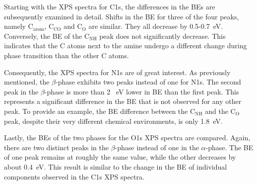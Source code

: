 Starting with the \ac{XPS} spectra for C1s, the differences in the \acp{BE} are subsequently examined in detail. Shifts in the \ac{BE} for three of the four peaks, namely $\mathrm{C_{arom}}$, $\mathrm{C_{CO}}$ and $\mathrm{C_{O}}$ are similar. They all decrease by 0.5-0.7~\si{\eV}. Conversely, the \ac{BE} of the $\mathrm{C_{NH}}$ peak does not significantly decrease. This indicates that the C atoms next to the amine undergo a different change during phase transition than the other C atoms.

Consequently, the \ac{XPS} spectra for N1s are of great interest. As previously mentioned, the $\beta$-phase exhibits two peaks instead of one for N1s. The second peak in the $\beta$-phase is more than 2 ~\si{\eV} lower in \ac{BE} than the first peak. This represents a significant difference in the \ac{BE} that is not observed for any other peak. To provide an example, the \ac{BE} difference between the $\mathrm{C_{NH}}$ and the $\mathrm{C_{O}}$ peak, despite their very different chemical environments, is only 1.8~\si{\eV}.

Lastly, the \acp{BE} of the two phases for the O1s \ac{XPS} spectra are compared. Again, there are two distinct peaks in the $\beta$-phase instead of one in the $\alpha$-phase. The \ac{BE} of one peak remains at roughly the same value, while the other decreases by about 0.4~\si{\eV}. This result is similar to the change in the \ac{BE} of individual components observed in the C1s \ac{XPS} spectra.

\cleardoublepage

